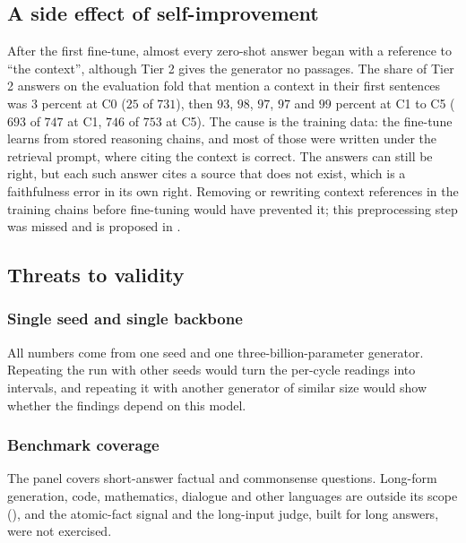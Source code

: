 \subsection{A side effect of self-improvement}
\label{sec:disc-phantom}

After the first fine-tune, almost every zero-shot answer began with a reference to ``the context'', although Tier 2 gives the generator no passages. The share of Tier 2 answers on the evaluation fold that mention a context in their first sentences was $3$ percent at C0 ($25$ of $731$), then $93$, $98$, $97$, $97$ and $99$ percent at C1 to C5 ($693$ of $747$ at C1, $746$ of $753$ at C5). The cause is the training data: the fine-tune learns from stored reasoning chains, and most of those were written under the retrieval prompt, where citing the context is correct. The answers can still be right, but each such answer cites a source that does not exist, which is a faithfulness error in its own right. Removing or rewriting context references in the training chains before fine-tuning would have prevented it; this preprocessing step was missed and is proposed in .

\subsection{Threats to validity}
\label{sec:disc-threats}

\subsubsection{Single seed and single backbone}
\label{sec:disc-threat-seed}

All numbers come from one seed and one three-billion-parameter generator. Repeating the run with other seeds would turn the per-cycle readings into intervals, and repeating it with another generator of similar size would show whether the findings depend on this model.

\subsubsection{Benchmark coverage}
\label{sec:disc-threat-benchmark}

The panel covers short-answer factual and commonsense questions. Long-form generation, code, mathematics, dialogue and other languages are outside its scope (), and the atomic-fact signal and the long-input judge, built for long answers, were not exercised.

